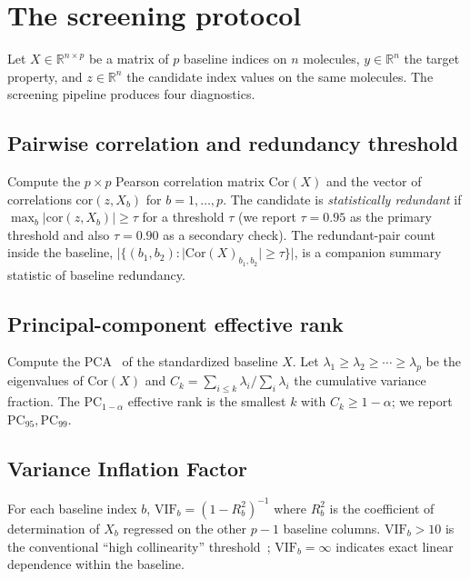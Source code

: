 \documentclass[STIX1COL]{WileyNJDv5}
\theoremstyle{definition}
\begin{document}
\section{The screening protocol}\label{sec:protocol}

Let $X\in\mathbb{R}^{n\times p}$ be a matrix of $p$ baseline indices
on $n$ molecules, $y\in\mathbb{R}^n$ the target property, and
$z\in\mathbb{R}^n$ the candidate index values on the same molecules.
The screening pipeline produces four diagnostics.

\subsection{Pairwise correlation and redundancy threshold}
Compute the $p\times p$ Pearson correlation matrix $\mathrm{Cor}(X)$
and the vector of correlations $\mathrm{cor}(z,X_b)$ for
$b=1,\ldots,p$. The candidate is \emph{statistically redundant} if
$\max_b|\mathrm{cor}(z,X_b)|\ge\tau$ for a threshold $\tau$ (we
report $\tau=0.95$ as the primary threshold and also
$\tau=0.90$ as a secondary check). The redundant-pair count
inside the baseline,
$|\{(b_1,b_2):|\mathrm{Cor}(X)_{b_1,b_2}|\ge\tau\}|$, is a
companion summary statistic of baseline redundancy.

\subsection{Principal-component effective rank}
Compute the PCA~\cite{WoldEsbensenGeladi1987PCA} of the
standardized baseline $X$. Let
$\lambda_1\ge\lambda_2\ge\cdots\ge\lambda_p$ be the eigenvalues of
$\mathrm{Cor}(X)$ and $C_k=\sum_{i\le k}\lambda_i/\sum_i\lambda_i$
the cumulative variance fraction. The
$\mathrm{PC}_{1-\alpha}$ effective rank is the smallest $k$ with
$C_k\ge 1-\alpha$; we report $\mathrm{PC}_{95}, \mathrm{PC}_{99}$.

\subsection{Variance Inflation Factor}
For each baseline index $b$, $\mathrm{VIF}_b=(1-R_b^2)^{-1}$ where
$R_b^2$ is the coefficient of determination of $X_b$ regressed on
the other $p-1$ baseline columns. $\mathrm{VIF}_b>10$ is the
conventional ``high collinearity'' threshold~\cite{OBrien2007VIF};
$\mathrm{VIF}_b=\infty$ indicates exact linear dependence within
the baseline.
\end{document}
